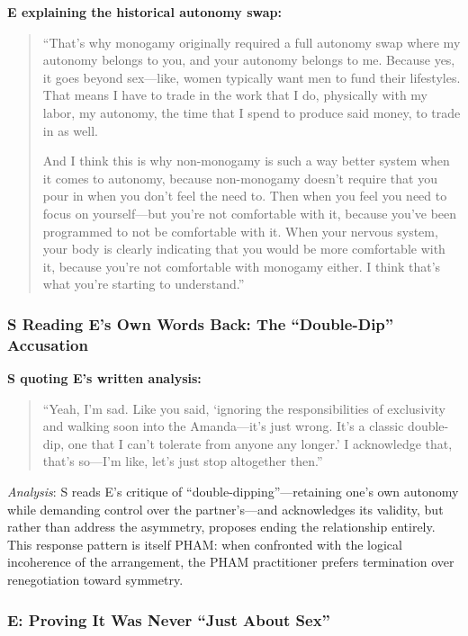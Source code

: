 \documentclass[12pt, letterpaper]{article}
\begin{document}
\textbf{E explaining the historical autonomy swap:}
\begin{quote}
``That's why monogamy originally required a full autonomy swap where my autonomy belongs to you, and your autonomy belongs to me. Because yes, it goes beyond sex---like, women typically want men to fund their lifestyles. That means I have to trade in the work that I do, physically with my labor, my autonomy, the time that I spend to produce said money, to trade in as well.

And I think this is why non-monogamy is such a way better system when it comes to autonomy, because non-monogamy doesn't require that you pour in when you don't feel the need to. Then when you feel you need to focus on yourself---but you're not comfortable with it, because you've been programmed to not be comfortable with it. When your nervous system, your body is clearly indicating that you would be more comfortable with it, because you're not comfortable with monogamy either. I think that's what you're starting to understand.''
\end{quote}

\subsubsection{S Reading E's Own Words Back: The ``Double-Dip'' Accusation}

\textbf{S quoting E's written analysis:}
\begin{quote}
``Yeah, I'm sad. Like you said, `ignoring the responsibilities of exclusivity and walking soon into the Amanda---it's just wrong. It's a classic double-dip, one that I can't tolerate from anyone any longer.' I acknowledge that, that's so---I'm like, let's just stop altogether then.''
\end{quote}

\textit{Analysis}: S reads E's critique of ``double-dipping''---retaining one's own autonomy while demanding control over the partner's---and acknowledges its validity, but rather than address the asymmetry, proposes ending the relationship entirely. This response pattern is itself PHAM: when confronted with the logical incoherence of the arrangement, the PHAM practitioner prefers termination over renegotiation toward symmetry.

\subsubsection{E: Proving It Was Never ``Just About Sex''}
\end{document}
